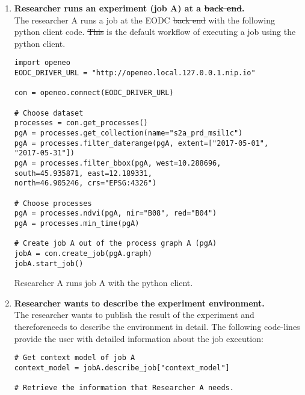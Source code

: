 \documentclass[draft,final]{vutinfth} %
\newenvironment{code}{\captionsetup{type=listing}}{}
\providecommand{\DIFaddtex}[1]{{\protect\color{blue}\uwave{#1}}} %
\providecommand{\DIFdeltex}[1]{{\protect\color{red}\sout{#1}}}                      %
\providecommand{\DIFaddbegin}{} %
\providecommand{\DIFaddend}{} %
\providecommand{\DIFdelbegin}{} %
\providecommand{\DIFdelend}{} %
\providecommand{\DIFadd}[1]{\texorpdfstring{\DIFaddtex{#1}}{#1}} %
\providecommand{\DIFdel}[1]{\texorpdfstring{\DIFdeltex{#1}}{}} %
\begin{document}
\begin{enumerate}
	\item \textbf{Researcher runs an experiment (job A) at a \DIFdelbegin \DIFdel{back end}\DIFdelend \DIFaddbegin \DIFadd{backend}\DIFaddend .}\\
	The researcher A runs a job at the EODC \DIFdelbegin \DIFdel{back end }\DIFdelend \DIFaddbegin \DIFadd{backend }\DIFaddend with the following python client code. \DIFdelbegin \DIFdel{This }\DIFdelend \DIFaddbegin \DIFadd{It }\DIFaddend is the default workflow of executing a job using the python client. 

\begin{code}
	\begin{verbatim}
import openeo
EODC_DRIVER_URL = "http://openeo.local.127.0.0.1.nip.io"

con = openeo.connect(EODC_DRIVER_URL)

# Choose dataset
processes = con.get_processes()
pgA = processes.get_collection(name="s2a_prd_msil1c")
pgA = processes.filter_daterange(pgA, extent=["2017-05-01", 
"2017-05-31"])
pgA = processes.filter_bbox(pgA, west=10.288696, 
south=45.935871, east=12.189331, 
north=46.905246, crs="EPSG:4326")

# Choose processes
pgA = processes.ndvi(pgA, nir="B08", red="B04")
pgA = processes.min_time(pgA)

# Create job A out of the process graph A (pgA)
jobA = con.create_job(pgA.graph)
jobA.start_job()
	\end{verbatim}
	\caption{Researcher A runs job A with the python client.}
	\label{lst:impl_usecase2_1}
\end{code}
	\item \textbf{Researcher wants to describe the experiment environment.}\\
	The researcher wants to publish the result of the experiment and therefore\DIFaddbegin \DIFadd{, }\DIFaddend needs to describe the environment in detail. The following code-lines provide the user with detailed information about the job execution:

\begin{code}
	\begin{verbatim}
# Get context model of job A
context_model = jobA.describe_job["context_model"]

# Retrieve the information that Researcher A needs.


\end{verbatim}
\end{code}
\end{enumerate}
\end{document}
